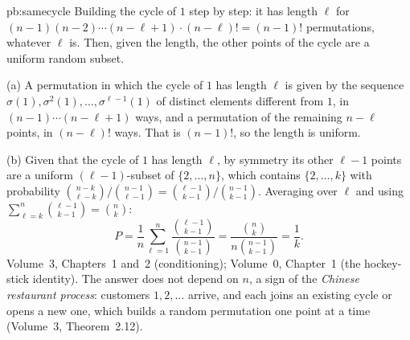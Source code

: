 \begin{solution}{pb:samecycle}
\idea Building the cycle of $1$ step by step: it has length $\ell$ for $(n-1)(n-2)\cdots(n-\ell+1)\cdot(n-\ell)!=(n-1)!$
permutations, whatever $\ell$ is. Then, given the length, the other points of the cycle are a uniform random subset.

\writeup (a) A permutation in which the cycle of $1$ has length $\ell$ is given by the sequence $\sigma(1),\sigma^2(1),\dots,\sigma^{\ell-1}(1)$
of distinct elements different from $1$, in $(n-1)\cdots(n-\ell+1)$ ways, and a permutation of the remaining $n-\ell$ points, in
$(n-\ell)!$ ways. That is $(n-1)!$, so the length is uniform.

(b) Given that the cycle of $1$ has length $\ell$, by symmetry its other $\ell-1$ points are a uniform $(\ell-1)$-subset of
$\{2,\dots,n\}$, which contains $\{2,\dots,k\}$ with probability $\binom{n-k}{\ell-k}/\binom{n-1}{\ell-1}=\binom{\ell-1}{k-1}/\binom{n-1}{k-1}$.
Averaging over $\ell$ and using $\sum_{\ell=k}^n\binom{\ell-1}{k-1}=\binom nk$:
\[
P=\frac1n\sum_{\ell=1}^n\frac{\binom{\ell-1}{k-1}}{\binom{n-1}{k-1}}=\frac{\binom nk}{n\binom{n-1}{k-1}}=\frac1k.
\]
\tools Volume~3, Chapters~1 and~2 (conditioning); Volume~0, Chapter~1 (the hockey-stick identity).
\leads The answer does not depend on $n$, a sign of the \emph{Chinese restaurant process}: customers $1,2,\dots$ arrive, and each
joins an existing cycle or opens a new one, which builds a random permutation one point at a time (Volume~3, Theorem~2.12).
\end{solution}

